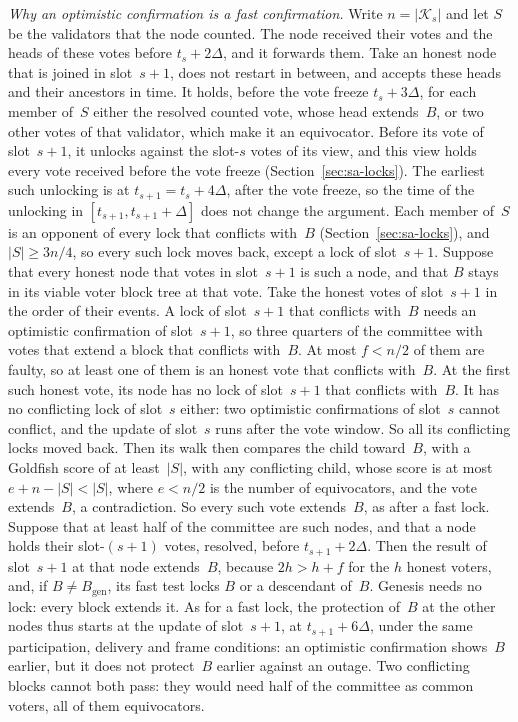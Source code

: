 \documentclass{article}
\newcommand{\genesis}{B_{\mathrm{gen}}}
\newcommand{\committee}{\mathcal K}
\begin{document}
\emph{Why an optimistic confirmation is a fast confirmation.}  Write $n=|\committee_s|$ and
let $S$ be the validators that the node counted.  The node received their
votes and the heads of these votes before $t_s+2\Delta$, and it forwards
them.  Take an honest node that is joined in slot~$s+1$, does not restart
in between, and accepts these heads and their ancestors in time.  It
holds, before the vote freeze $t_s+3\Delta$, for each member of~$S$ either
the resolved counted vote, whose head extends~$B$, or two other votes of
that validator, which make it an equivocator.  Before
its vote of slot~$s+1$, it unlocks against the slot-$s$ votes of its view,
and this view holds every vote received before the vote freeze
(Section~\ref{sec:sa-locks}).  The earliest such unlocking is at
$t_{s+1}=t_s+4\Delta$, after the vote freeze, so the time of the unlocking
in $[t_{s+1},t_{s+1}+\Delta]$ does not change the argument.  Each member
of~$S$ is an opponent of every lock that conflicts with~$B$
(Section~\ref{sec:sa-locks}), and $|S|\geq 3n/4$, so every such lock moves
back, except a lock of slot~$s+1$.  Suppose that every honest node that votes
in slot~$s+1$ is such a node, and that $B$ stays in its viable voter block
tree at that vote.  Take the honest votes of slot~$s+1$ in the order of
their events.  A lock of slot~$s+1$ that conflicts with~$B$
needs an optimistic confirmation of slot~$s+1$, so three quarters of the
committee with votes that extend a block that conflicts with~$B$.  At most $f<n/2$
of them are faulty, so at least one of them is an honest vote that
conflicts with~$B$.  At the first such honest vote, its node has no lock
of slot~$s+1$ that conflicts with~$B$.  It has no conflicting lock of
slot~$s$ either: two optimistic confirmations of slot~$s$ cannot conflict,
and the update of slot~$s$ runs after the vote window.  So all its
conflicting locks moved back.  Then its walk
then compares the child toward~$B$, with a Goldfish score of at
least~$|S|$, with any conflicting child, whose score is at most
$e+n-|S|<|S|$, where $e<n/2$ is the number of equivocators, and the vote
extends~$B$, a contradiction.  So every such vote extends~$B$, as after a
fast lock.  Suppose that at least half of the
committee are such nodes, and that a node holds their slot-$(s+1)$ votes,
resolved, before $t_{s+1}+2\Delta$.  Then the result of slot~$s+1$ at that node
extends~$B$, because $2h>h+f$ for the $h$ honest voters, and, if
$B\neq\genesis$, its fast test locks $B$ or a descendant of~$B$.  Genesis
needs no lock: every block extends it.  As for a fast lock, the protection of~$B$ at the other
nodes thus starts at the update of slot~$s+1$, at $t_{s+1}+6\Delta$, under
the same participation, delivery and frame conditions: an optimistic confirmation shows~$B$ earlier,
but it does not protect~$B$ earlier against an outage.  Two conflicting blocks cannot both pass: they would
need half of the committee as common voters, all of them equivocators.
\end{document}
